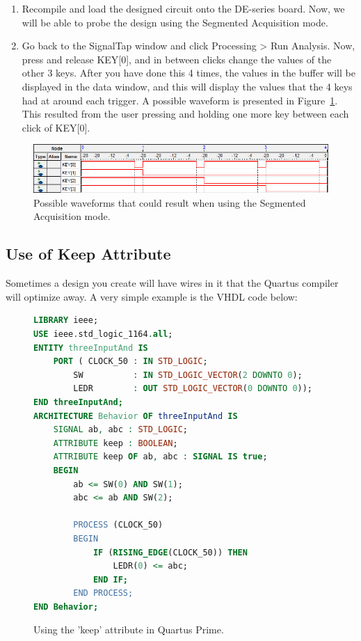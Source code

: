 \documentclass[11pt, twoside, pdftex]{article}
\begin{document}
\begin{enumerate}
\item Recompile and load the designed circuit onto the DE-series board. Now, we will be able to probe the design
using the Segmented Acquisition mode.
  
\item Go back to the SignalTap window and click {\sf Processing > Run Analysis}. Now, press and release KEY[0], and in between clicks
change the values of the other 3 keys. After you have done this 4 times, the values
in the buffer will be displayed in the data window, and this will display the values that the 4 keys had at around each trigger.
A possible waveform is presented in Figure~\ref{fig:24}. This resulted from the user pressing and holding one more key between each click of KEY[0].
  
\end{enumerate}

\begin{figure}[H]
   \begin{center}
      \includegraphics[scale=0.65]{figures/figure24.png}
   \caption{Possible waveforms that could result when using the Segmented Acquisition mode.} 
	 \label{fig:24}
	 \end{center}
\end{figure}

\subsection{Use of Keep Attribute}

Sometimes a design you create will have wires in it that the Quartus compiler will optimize away. A very simple example
is the VHDL code below:

\begin{figure}[H]
\begin{lstlisting}[language=VHDL, xleftmargin=2cm]
LIBRARY ieee;
USE ieee.std_logic_1164.all;
ENTITY threeInputAnd IS
    PORT ( CLOCK_50 : IN STD_LOGIC;
        SW          : IN STD_LOGIC_VECTOR(2 DOWNTO 0);
        LEDR        : OUT STD_LOGIC_VECTOR(0 DOWNTO 0));
END threeInputAnd;
ARCHITECTURE Behavior OF threeInputAnd IS
    SIGNAL ab, abc : STD_LOGIC;
    ATTRIBUTE keep : BOOLEAN;
    ATTRIBUTE keep OF ab, abc : SIGNAL IS true;
    BEGIN
        ab <= SW(0) AND SW(1);
        abc <= ab AND SW(2);

        PROCESS (CLOCK_50)
        BEGIN
            IF (RISING_EDGE(CLOCK_50)) THEN
                LEDR(0) <= abc;
            END IF;
        END PROCESS;
END Behavior;
\end{lstlisting}
	\caption{Using the 'keep' attribute in Quartus Prime.}
	\label{fig:25}
\end{figure}
 
\end{document}

